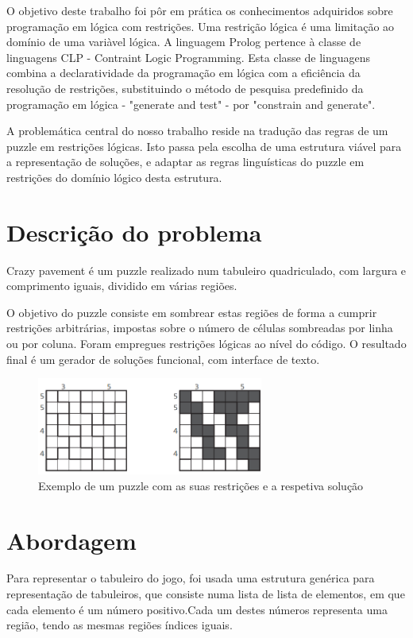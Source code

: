 \documentclass[runningheads,a4paper,12pt]{llncs}
\begin{document}
O objetivo deste trabalho foi pôr em prática os conhecimentos adquiridos sobre programação em lógica com restrições. Uma restrição lógica é uma limitação ao domínio de uma variàvel lógica. A linguagem Prolog pertence à classe de linguagens CLP - Contraint Logic Programming. Esta classe de linguagens combina a declaratividade da programação em lógica com a eficiência da resolução de restrições, substituindo o método de pesquisa predefinido da programação em lógica - "generate and test" - por "constrain and generate".

A problemática central do nosso trabalho reside na tradução das regras de um puzzle em restrições lógicas. Isto passa pela escolha de uma estrutura viável para a representação de soluções, e adaptar as regras linguísticas do puzzle em restrições do domínio lógico desta estrutura.

\section{Descrição do problema}

Crazy pavement é um puzzle realizado num tabuleiro quadriculado, com largura e comprimento iguais, dividido em várias regiões.

O objetivo do puzzle consiste em sombrear estas regiões de forma a cumprir restrições arbitrárias, impostas sobre o número de células sombreadas por linha ou por coluna. 
Foram empregues restrições lógicas ao nível do código. O resultado final é um gerador de soluções funcional, com interface de texto.
 
\begin{figure} 
\centering
\includegraphics[height=3.2cm]{exemplo1.png}
\caption{Exemplo de um puzzle com as suas restrições e a respetiva solução} 
\label{fig:crazypavementexandsol}
\end{figure}

\newpage

\section{Abordagem}

Para representar o tabuleiro do jogo, foi usada uma estrutura genérica para representação de tabuleiros, que consiste numa lista de lista de elementos, em que cada elemento é um número positivo.Cada um destes números representa uma região, tendo as mesmas regiões índices iguais.
\end{document}
